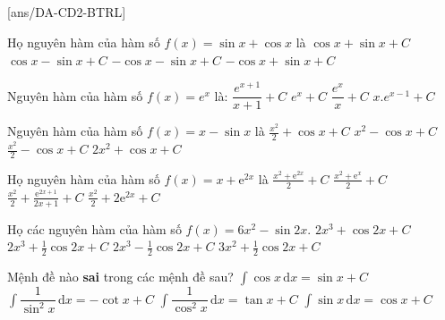 \subsection{\btrl}
[ans/DA-CD2-BTRL]
\begin{ex}[BGD-2025]%
 Họ nguyên hàm của hàm số $f(x) = \sin x + \cos x$ là
 \choice
 {$\cos x + \sin x + C$}
 {$\cos x - \sin x + C$}
 {$-\cos x - \sin x + C$}
 {\True $-\cos x + \sin x + C$}
\end{ex}
\begin{ex}[MH BGD-2025]%
 Nguyên hàm của hàm số $f(x) = e^x$ là:
 \choice
 {$\dfrac{e^{x+1}}{x+1} + C$}
 {\True $e^x + C$}
 {$\dfrac{e^x}{x} + C$}
 {$x.e^{x-1} + C$}
\end{ex}
\begin{ex}
 [ĐH Vinh-2025] Nguyên hàm của hàm số $f(x) = x - \sin x$ là
 \choice
 {\True $\frac{x^2}{2} + \cos x + C$}
 {$x^2 - \cos x + C$}
 {$\frac{x^2}{2} - \cos x + C$}
 {$2x^2 + \cos x + C$}
\end{ex}
\begin{ex}
 Họ nguyên hàm của hàm số $f(x) = x + \mathrm{e}^{2x}$ là
 \choice
 {\True $\frac{x^2 + \mathrm{e}^{2x}}{2} + C$}
 {$\frac{x^2 + \mathrm{e}^x}{2} + C$}
 {$\frac{x^2}{2} + \frac{\mathrm{e}^{2x+1}}{2x+1} + C$}
 {$\frac{x^2}{2} + 2\mathrm{e}^{2x} + C$}
\end{ex}
\begin{ex}
Họ các nguyên hàm của hàm số $f(x) = 6x^2 - \sin 2x$.
 \choice
 {$2x^3 + \cos 2x + C$}
 {\True $2x^3 + \frac{1}{2}\cos 2x + C$}
 {$2x^3 - \frac{1}{2}\cos 2x + C$}
 {$3x^2 + \frac{1}{2}\cos 2x + C$}
\end{ex}
\begin{ex}%
    Mệnh đề nào {\bf sai} trong các mệnh đề sau?
    \choice
    {$\displaystyle\int\cos x\mathrm{\,d}x=\sin x+C$}
    {$\displaystyle\int \dfrac{1}{\sin^2x}\mathrm{\,d}x=-\cot x+C$}
    {$\displaystyle\int \dfrac{1}{\cos^2x} \mathrm{\,d}x=\tan x+C$}
    {\True $\displaystyle\int \sin x\mathrm{\,d}x=\cos x+C$}
\end{ex}
